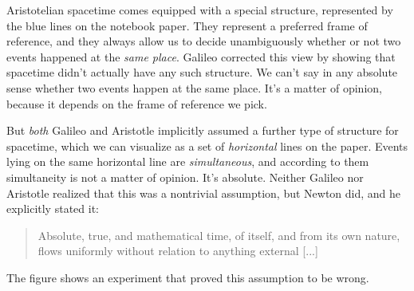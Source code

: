 Aristotelian spacetime comes equipped with a special structure, represented by the blue
lines on the notebook paper. They represent a preferred frame of reference, and they always
allow us to decide unambiguously whether or not two events happened at the \emph{same place}.
Galileo corrected this view by showing that spacetime didn't actually have any such structure.
We can't say in any absolute sense whether two events happen at the same place. It's a matter
of opinion, because it depends on the frame of reference we pick.

But \emph{both} Galileo and Aristotle implicitly assumed a further type of structure
for spacetime, which we can visualize as a set of \emph{horizontal} lines on the paper.
Events lying on the same horizontal line are \emph{simultaneous}, and according to them
simultaneity is not a matter of opinion. It's absolute. Neither Galileo nor Aristotle realized
that this was a nontrivial assumption, but Newton did, and he explicitly stated it:
%
\begin{quote}
Absolute, true, and mathematical time, of itself, and from its own nature,
flows uniformly without relation to anything external [...]
\end{quote}
%
The figure  shows an experiment that proved this assumption to be wrong.

\begin{figure}\label{fig:hk-in-cabin}
\end{figure}
